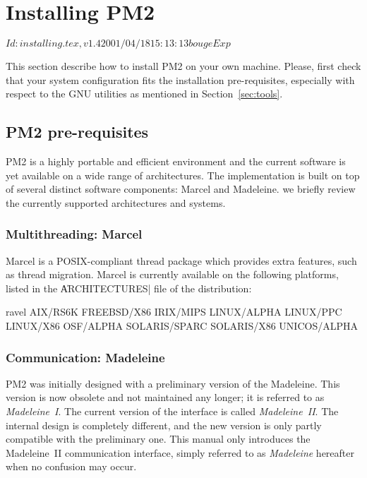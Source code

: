 \chapter{Installing PM2}

\stamp $Id: installing.tex,v 1.4 2001/04/18 15:13:13 bouge Exp $

This section describe how to install PM2 on your own machine.
Please, first check that your system configuration fits the
installation pre-requisites, especially with respect to the GNU
utilities as mentioned in Section~\ref{sec:tools}.

\section{PM2 pre-requisites}

PM2 is a highly portable and efficient environment and the current
software is yet available on a wide range of architectures. The
implementation is built on top of several distinct software
components: Marcel and Madeleine. we briefly review the currently
supported architectures and systems. 


\subsection{Multithreading: Marcel}

Marcel is a POSIX-compliant thread package which provides extra
features, such as thread migration.  Marcel is currently available on
the following platforms, listed in the \|ARCHITECTURES| file of the
distribution:
\begin{shell}
ravel%
AIX/RS6K
FREEBSD/X86
IRIX/MIPS
LINUX/ALPHA
LINUX/PPC
LINUX/X86
OSF/ALPHA
SOLARIS/SPARC
SOLARIS/X86
UNICOS/ALPHA
\end{shell}


\subsection{Communication: Madeleine}

PM2 was initially designed with a preliminary version of the
Madeleine. This version is now obsolete and not maintained any longer;
it is referred to as \emph{Madeleine~I}. The current version of the
interface is called \emph{Madeleine~II}. The internal design is completely
different, and the new version is only partly compatible with the
preliminary one. This manual only introduces the Madeleine~II
communication interface, simply referred to as \emph{Madeleine} hereafter
when no confusion may occur.

